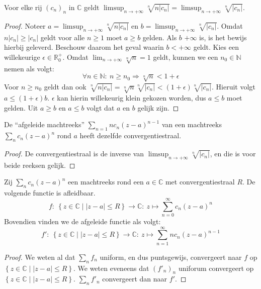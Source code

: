 \documentclass[main.tex]{subfiles}
\begin{document}
\begin{blem}
  \label{lem:afgeleide-reeks-zelfde-limsup}
  Voor elke rij $(c_{n})_{n}$ in $\mathbb{C}$ geldt $\limsup_{n\rightarrow +\infty}\sqrt[n]{n|c_{n}|} = \limsup_{n\rightarrow +\infty}\sqrt[n]{|c_{n}|}$.

  \begin{proof}
    Noteer $a=\limsup_{n\rightarrow +\infty}\sqrt[n]{n|c_{n}|}$ en $b= \limsup_{n\rightarrow +\infty}\sqrt[n]{|c_{n}|}$.
    Omdat $n|c_{n}| \ge |c_{n}|$ geldt voor alle $n \ge 1$ moet $a\ge b$ gelden.
    Als $b$ $+\infty$ is, is het bewijs hierbij geleverd.
    Beschouw daarom het geval waarin $b < +\infty$ geldt.
    Kies een willekeurige $\epsilon \in \mathbb{R}_{0}^{+}$.
    Omdat $\lim_{n\rightarrow +\infty}\sqrt[n]{n} = 1$ geldt\waarom, kunnen we een $n_{0}\in \mathbb{N}$ nemen als volgt:
    \[ \forall n\in \mathbb{N}:\ n \ge n_{0} \Rightarrow \sqrt[n]{n} < 1+\epsilon \]
    Voor $n\ge n_{0}$ geldt dan ook $\sqrt[n]{n|c_{n}|} = \sqrt[n]{n}\sqrt[n]{|c_{n}|} < (1+\epsilon)\sqrt[n]{|c_{n}|}$.
    Hieruit volgt $a\le (1+\epsilon)b$.
    $\epsilon$ kan hierin willekeurig klein gekozen worden, dus $a\le b$ moet gelden.
    Uit $a\ge b$ en $a \le b$ volgt dat $a$ en $b$ gelijk zijn.
  \end{proof}
\end{blem}

\begin{gev}
  \label{gev:afgeleide-reeks-zelfde-straal}
  De ``afgeleide machtreeks'' $\sum_{n=1}nc_{n}(z-a)^{n-1}$ van een machtreeks $\sum_{n}c_{n}(z-a)^{n}$ rond $a$ heeft dezelfde convergentiestraal.

  \begin{proof}
    De convergentiestraal is de inverse van $\limsup_{n\rightarrow +\infty}\sqrt[n]{|c_{n}|}$, en die is voor beide reeksen gelijk.
  \end{proof}
\end{gev}

\begin{bst}
  Zij $\sum_{n}c_{n}(z-a)^{n}$ een machtreeks rond een $a\in \mathbb{C}$ met convergentiestraal $R$.
  De volgende functie is afleidbaar.
  \[ f:\ \left\{ z \in \mathbb{C} \mid |z-a| \le R \right\} \rightarrow \mathbb{C}:\ z \mapsto \sum_{n=0}^{\infty}c_{n}(z-a)^{n}  \]
  Bovendien vinden we de afgeleide functie als volgt:
  \[ f':\ \left\{ z \in \mathbb{C} \mid |z-a| \le R \right\} \rightarrow \mathbb{C}:\ z \mapsto \sum_{n=1}^{\infty}nc_{n}(z-a)^{n-1}  \]

  \begin{proof}
    We weten al dat $\sum_{n}f_{n}$ uniform, en dus puntsgewijs\needed, convergeert naar $f$ op $\left\{ z \in \mathbb{C} \mid |z-a| \le R \right\}$.
    We weten eveneens dat $(f'_{n})_{n}$ uniforum convergeert op $\left\{ z \in \mathbb{C} \mid |z-a| \le R \right\}$.
    $\sum_{n}f'_{n}$ convergeert dan naar $f'$.
  \end{proof}
\end{bst}
\end{document}
